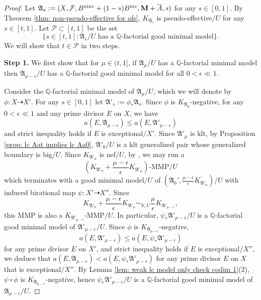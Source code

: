 \documentclass[12pt]{amsart}
\numberwithin{equation}{section}
\newcommand{\Mm}{{\bf{M}}}
\newcommand{\ninv}{\operatorname{ninv}}
\newcommand{\inv}{\operatorname{inv}}
\newcommand{\Aa}{{\mathfrak{A}}}
\newcommand{\Ff}{\mathcal{F}}
\theoremstyle{definition}
\theoremstyle{definition}
\theoremstyle{definition}
\begin{document}
\fi
\begin{proof}
    Let $\Aa_s:=(X,\Ff,B^{\ninv}+(1-s)B^{\inv},\Mm+\overline{A},s)$ for any $s\in [0,1]$. By Theorem \ref{thm: non-pseudo-effective for afs}, $K_{\Aa_s}$ is pseudo-effective$/U$ for any $s\in [t,1]$.
Let $\mathcal P \subset [t, 1]$ be the set \[\{s \in [t, 1]: \Aa_s/U \text{ has a } \mathbb Q \text{-factorial good minimal model}\}.\]
    We will show that $t \in \mathcal P$ in two steps.



\medskip

\noindent\textbf{Step  1.} 
We first show that for $\mu \in (t, 1]$, if $\Aa_\mu/U$ has a $\mathbb Q$-factorial minimal model then 
$\Aa_{\mu-\epsilon}/U$ has a $\mathbb Q$-factorial good minimal model for all $0<\epsilon \ll 1$.

Consider the $\mathbb Q$-factorial minimal model of $\Aa_\mu/U$, which we will denote by $\phi\colon X \dashrightarrow X'$.  For any $s \in [0, 1]$ let $\Aa'_s:=\phi_*\Aa_s.$
Since $\phi$ is $K_{\Aa_{\mu}}$-negative, for any $0<\epsilon\ll 1$ and any prime divisor $E$ on $X$, we have
$$a(E,\Aa_{\mu-\epsilon})\leq a(E,\Aa'_{\mu-\epsilon})$$
and strict inequality holds if $E$ is exceptional$/X'$.
Since $\Aa'_{\mu}$ is klt, by Proposition \ref{prop: lc Aat implies lc Aa0}, $\Aa'_0/U$ is a klt generalized pair whose generalized boundary is big$/U$. Since $K_{\Aa'_{\mu}}$ is nef$/U$, by \cite[Lemma 4.4]{BZ16}, we may run a
$$\left(K_{\Aa'_0}+\frac{\mu-\epsilon}{\epsilon}K_{\Aa'_{\mu}}\right)\text{-MMP}/U$$
which terminates with a good minimal model$/U$ of $(\Aa_0',\frac{\mu-\epsilon}{\epsilon}\overline{K_{\Aa'_{\mu}}})/U$ with induced birational map $\psi: X'\dashrightarrow X''$. Since
$$K_{\Aa'_0}+\frac{\mu-\epsilon}{\epsilon}K_{\Aa'_{\mu}}\sim_{\mathbb R,U}\frac{\mu}{\epsilon}K_{\Aa'_{\mu-\epsilon}},$$
this MMP is also a $K_{\Aa'_{\mu-\epsilon}}$-MMP$/U$. In particular, $\psi_*\Aa'_{\mu-\epsilon}/U$ is a $\mathbb Q$-factorial good minimal model of $\Aa'_{\mu-\epsilon}/U$. Since $\phi$ is $K_{\Aa_{\mu-\epsilon}}$-negative, 
$$a(E,\Aa'_{\mu-\epsilon})\leq a(E,\psi_*\Aa'_{\mu-\epsilon})$$
for any prime divisor $E$ on $X'$, and strict inequality holds if $E$ is exceptional$/X''$, we deduce that $a(E,\Aa_{\mu-\epsilon})<a(E,\psi_*\Aa'_{\mu-\epsilon})$ for any prime divisor $E$ on $X$ that is exceptional$/X''$. By Lemma \ref{lem: weak lc model only check codim 1}(2), $\psi\circ\phi$ is $K_{\Aa_{\mu-\epsilon}}$-negative, hence $\psi_*\Aa'_{\mu-\epsilon}/U$ is a $\mathbb Q$-factorial good minimal model of $\Aa_{\mu-\epsilon}/U$. 



\end{proof}
\end{document}
